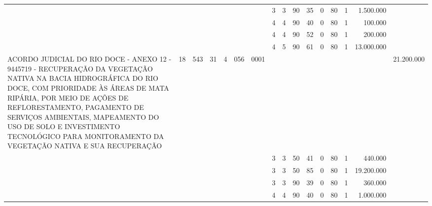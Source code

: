 \documentclass{article}
\begin{document}
\begin{longtable}[c]{m{6.5cm}|m{1pt}m{1pt}m{1pt}m{1pt}m{1pt}m{1pt}|m{1pt}m{1pt}m{0.5pt}m{1pt}|m{1pt}|m{1pt}m{1pt}|m{1pt}|m{2pt}}
& & & & & & & \multicolumn{1}{c}{ 3 } & \multicolumn{1}{c}{ 3 } & \multicolumn{1}{c}{ 90 } & \multicolumn{1}{c|}{ 35 } & \multicolumn{1}{c|}{ 0 } & \multicolumn{1}{l}{ 80 } & \multicolumn{1}{c|}{ 1 } & \multicolumn{1}{r|}{ 1.500.000 } & \\
& & & & & & & \multicolumn{1}{c}{ 4 } & \multicolumn{1}{c}{ 4 } & \multicolumn{1}{c}{ 90 } & \multicolumn{1}{c|}{ 40 } & \multicolumn{1}{c|}{ 0 } & \multicolumn{1}{l}{ 80 } & \multicolumn{1}{c|}{ 1 } & \multicolumn{1}{r|}{ 100.000 } & \\
& & & & & & & \multicolumn{1}{c}{ 4 } & \multicolumn{1}{c}{ 4 } & \multicolumn{1}{c}{ 90 } & \multicolumn{1}{c|}{ 52 } & \multicolumn{1}{c|}{ 0 } & \multicolumn{1}{l}{ 80 } & \multicolumn{1}{c|}{ 1 } & \multicolumn{1}{r|}{ 200.000 } & \\
& & & & & & & \multicolumn{1}{c}{ 4 } & \multicolumn{1}{c}{ 5 } & \multicolumn{1}{c}{ 90 } & \multicolumn{1}{c|}{ 61 } & \multicolumn{1}{c|}{ 0 } & \multicolumn{1}{l}{ 80 } & \multicolumn{1}{c|}{ 1 } & \multicolumn{1}{r|}{ 13.000.000 } & \\
\multicolumn{1}{L{5.5cm}|}{ ACORDO JUDICIAL DO RIO DOCE - ANEXO 12 - 9445719 - RECUPERAÇÃO DA VEGETAÇÃO NATIVA NA BACIA HIDROGRÁFICA DO RIO DOCE, COM PRIORIDADE ÀS ÁREAS DE MATA RIPÁRIA, POR MEIO DE AÇÕES DE REFLORESTAMENTO, PAGAMENTO DE SERVIÇOS AMBIENTAIS, MAPEAMENTO DO USO DE SOLO E INVESTIMENTO TECNOLÓGICO PARA MONITORAMENTO DA VEGETAÇÃO NATIVA E SUA RECUPERAÇÃO } & \multicolumn{1}{c}{ 18 } & \multicolumn{1}{c}{ 543 } & \multicolumn{1}{c}{ 31 } & \multicolumn{1}{l}{ 4 } & \multicolumn{1}{c}{ 056 } & \multicolumn{1}{l|}{ 0001 } & & & & & & & & & \multicolumn{1}{r}{ 21.200.000 } \\
& & & & & & & \multicolumn{1}{c}{ 3 } & \multicolumn{1}{c}{ 3 } & \multicolumn{1}{c}{ 50 } & \multicolumn{1}{c|}{ 41 } & \multicolumn{1}{c|}{ 0 } & \multicolumn{1}{l}{ 80 } & \multicolumn{1}{c|}{ 1 } & \multicolumn{1}{r|}{ 440.000 } & \\
& & & & & & & \multicolumn{1}{c}{ 3 } & \multicolumn{1}{c}{ 3 } & \multicolumn{1}{c}{ 50 } & \multicolumn{1}{c|}{ 85 } & \multicolumn{1}{c|}{ 0 } & \multicolumn{1}{l}{ 80 } & \multicolumn{1}{c|}{ 1 } & \multicolumn{1}{r|}{ 19.200.000 } & \\
& & & & & & & \multicolumn{1}{c}{ 3 } & \multicolumn{1}{c}{ 3 } & \multicolumn{1}{c}{ 90 } & \multicolumn{1}{c|}{ 39 } & \multicolumn{1}{c|}{ 0 } & \multicolumn{1}{l}{ 80 } & \multicolumn{1}{c|}{ 1 } & \multicolumn{1}{r|}{ 360.000 } & \\
& & & & & & & \multicolumn{1}{c}{ 4 } & \multicolumn{1}{c}{ 4 } & \multicolumn{1}{c}{ 90 } & \multicolumn{1}{c|}{ 40 } & \multicolumn{1}{c|}{ 0 } & \multicolumn{1}{l}{ 80 } & \multicolumn{1}{c|}{ 1 } & \multicolumn{1}{r|}{ 1.000.000 } & \\

\end{longtable}
\end{document}
